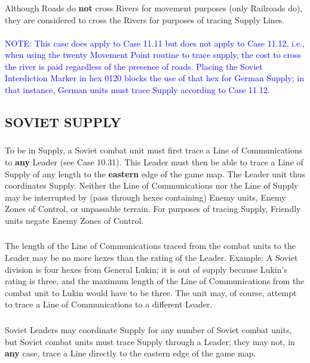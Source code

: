 \subsubsection{} Although Roads do \textbf{not} cross Rivers for movement purposes (only Railroads do), they are considered to cross the Rivers for purposes of tracing Supply Lines.
\nobreak\\\\
\textcolor{blue}{NOTE: This case does apply to Case 11.11 but does not apply to Case 11.12, i.e., when using the twenty Movement Point routine to trace supply, the cost to cross the river is paid regardless of the presence of roads. Placing the Soviet Interdiction Marker in hex 0120 blocks the use of that hex for German Supply; in that instance, German units must trace Supply according to Case 11.12.}

\subsection{SOVIET SUPPLY}

\subsubsection{} To be in Supply, a Soviet combat unit must first trace a Line of Communications to \textbf{any} Leader (see Case 10.31). This Leader must then be able to trace a Line of Supply of any length to the \textbf{eastern} edge of the game map. The Leader unit thus coordinates Supply. Neither the Line of Communications nor the Line of Supply may be interrupted by (pass through hexes containing) Enemy units, Enemy Zones of Control, or unpassable terrain. For purposes of tracing Supply, Friendly units negate Enemy Zones of Control.

\subsubsection{} The length of the Line of Communications traced from the combat units to the Leader may be no more hexes than the rating of the Leader. Example: A Soviet division is four hexes from General Lukin; it is out of supply because Lukin's rating is three, and the maximum length of the Line of Communications from the combat unit to Lukin would have to be three. The unit may, of course, attempt to trace a Line of Communications to a different Leader.

\subsubsection{} Soviet Leaders may coordinate Supply for any number of Soviet combat units, but Soviet combat units must trace Supply through a Leader; they may not, in \textbf{any} case, trace a Line directly to the eastern edge of the game map.

